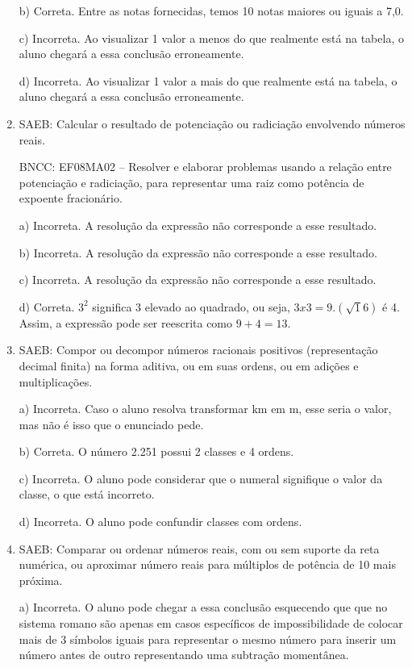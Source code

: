 \begin{enumerate}
b) Correta. Entre as notas fornecidas, temos 10 notas maiores ou
iguais a 7,0.

c) Incorreta. Ao visualizar 1 valor a menos do que realmente está
na tabela, o aluno chegará a essa conclusão erroneamente.

d) Incorreta. Ao visualizar 1 valor a mais do que realmente está
na tabela, o aluno chegará a essa conclusão erroneamente.

\item SAEB: Calcular o resultado de potenciação ou radiciação envolvendo
números reais.

BNCC: EF08MA02 -- Resolver e elaborar problemas usando a relação entre
potenciação e radiciação, para representar uma raiz como potência de
expoente fracionário.

a) Incorreta. A resolução da expressão não corresponde
a esse resultado.

b) Incorreta. A resolução da expressão não corresponde
a esse resultado.

c) Incorreta. A resolução da expressão não corresponde
a esse resultado.

d) Correta. $3^2$ significa 3 elevado ao quadrado, ou seja,
$3 x 3 = 9. (\sqrt 16)$ é 4. Assim, a expressão pode ser reescrita como
$9 + 4 = 13$.

\item SAEB: Compor ou decompor números racionais positivos (representação
decimal finita) na forma aditiva, ou em suas ordens, ou em adições e
multiplicações.

a) Incorreta. Caso o aluno resolva transformar km em m, esse seria
o valor, mas não é isso que o enunciado pede.

b) Correta. O número 2.251 possui 2 classes e 4 ordens.

c) Incorreta. O aluno pode considerar que o numeral signifique o
valor da classe, o que está incorreto.

d) Incorreta. O aluno pode confundir classes com ordens.

\item SAEB: Comparar ou ordenar números reais, com ou sem suporte da reta
numérica, ou aproximar número reais para múltiplos de potência de 10
mais próxima.

a) Incorreta. O aluno pode chegar a essa conclusão esquecendo que
que no sistema romano são apenas em casos específicos de impossibilidade
de colocar mais de 3 símbolos iguais para representar o mesmo número
para inserir um número antes de outro representando uma subtração
momentânea.


\end{enumerate}
